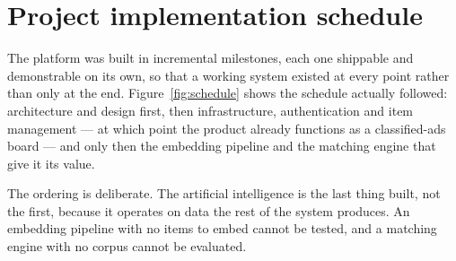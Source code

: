 \section{Project implementation schedule}

The platform was built in incremental milestones, each one shippable and
demonstrable on its own, so that a working system existed at every point rather
than only at the end. Figure~\ref{fig:schedule} shows the schedule actually
followed: architecture and design first, then infrastructure, authentication and
item management --- at which point the product already functions as a
classified-ads board --- and only then the embedding pipeline and the matching
engine that give it its value.

The ordering is deliberate. The artificial intelligence is the last thing built,
not the first, because it operates on data the rest of the system produces. An
embedding pipeline with no items to embed cannot be tested, and a matching
engine with no corpus cannot be evaluated.

